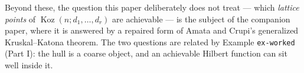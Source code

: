 \documentclass[11pt, a4paper, abstract=yes]{scrartcl}
\theoremstyle{definition}
\theoremstyle{remark}
\theoremstyle{plain}
\newcommand{\Koz}{\operatorname{Koz}}
\begin{document}
Beyond these, the question this paper deliberately does not treat --- which \emph{lattice points} of
\(\Koz(n;d_1,\dots,d_r)\) are achievable --- is the subject of the companion paper, where it is
answered by a repaired form of Amata and Crupi's generalized Kruskal--Katona theorem. The two
questions are related by Example \texttt{ex-worked} (Part I): the hull is a coarse object, and an achievable Hilbert
function can sit well inside it.
\end{document}
